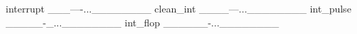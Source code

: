 \begin{textcode}
interrupt ___----...________
clean_int ____---...________
int_pulse _____-_...________
int_flop  ______-...________
\end{textcode}

